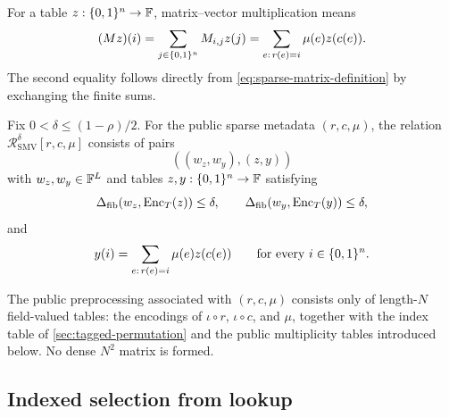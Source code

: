 For a table $z:\{0,1\}^n\to\mathbb{F}$, matrix--vector multiplication means
\begin{equation}
  (Mz)(i)
  =
  \sum_{j\in\{0,1\}^n}M_{i,j}z(j)
  =
  \sum_{e:\,r(e)=i}\mu(e)z(c(e)).
  \label{eq:sparse-matvec-coordinate}
\end{equation}
The second equality follows directly from \eqref{eq:sparse-matrix-definition} by exchanging the finite sums.

\begin{definition}
\label{def:sparse-matvec-relation}
Fix $0<\delta\le(1-\rho)/2$.  For the public sparse metadata $(r,c,\mu)$, the relation $\mathcal R^{\delta}_{\mathrm{SMV}}[r,c,\mu]$ consists of pairs
\[
  ((w_z,w_y),(z,y))
\]
with $w_z,w_y\in\mathbb{F}^L$ and tables $z,y:\{0,1\}^n\to\mathbb{F}$ satisfying
\begin{equation}
  \Delta_{\mathrm{fib}}(w_z,\operatorname{Enc}_T(z))\le\delta,
  \qquad
  \Delta_{\mathrm{fib}}(w_y,\operatorname{Enc}_T(y))\le\delta,
  \label{eq:sparse-matvec-commitment-distances}
\end{equation}
and
\begin{equation}
  y(i)=\sum_{e:\,r(e)=i}\mu(e)z(c(e))
  \qquad\text{for every }i\in\{0,1\}^n.
  \label{eq:sparse-matvec-relation}
\end{equation}
\end{definition}

The public preprocessing associated with $(r,c,\mu)$ consists only of length-$N$ field-valued tables: the encodings of $\iota\circ r$, $\iota\circ c$, and $\mu$, together with the index table of \cref{sec:tagged-permutation} and the public multiplicity tables introduced below.  No dense $N^2$ matrix is formed.

\subsection{Indexed selection from lookup}
\label{sec:indexed-selection}

